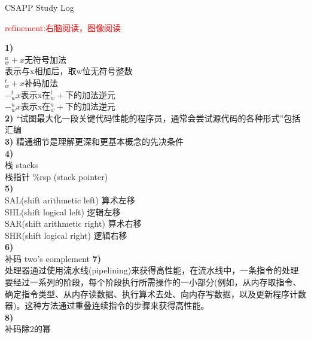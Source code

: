 \documentclass{article}
\newcommand{\red}[1]{\textcolor{red}{#1}}
\begin{document}
\begin{CJK}{UTF8}{gkai}
\end{CJK}
\begin{CJK}{UTF8}{gbsn}
\end{CJK}
\begin{CJK}{UTF8}{uyhei}
\fontsize{40pt}{40pt}\selectfont
\centerline{CSAPP Study Log}			
\fontsize{25pt}{25pt}\selectfont
\centerline{\red{refinement:右脑阅读，图像阅读}}	
\fontsize{18pt}{18pt}\selectfont
\noindent\textbf{1)}			\\
$_w^u+x$无符号加法			\\[0.5ex]
表示与x相加后，取w位无符号整数		\\[0.5ex]
$_w^t+x$补码加法			\\[0.5ex]
$-_w^tx$表示x在$^t_w+$下的加法逆元	\\[0.5ex]
$-_w^ux$表示x在$_w^u+$下的加法逆元	\\[1ex]
\textbf{2)}
``试图最大化一段关键代码性能的程序员，通常会尝试源代码的各种形式''包括汇编	\\[1ex]
\textbf{3)}
精通细节是理解更深和更基本概念的先决条件	\\[1ex]
\textbf{4)}	\\
栈	stacks	\\[1ex]
栈指针	\%rsp	(stack pointer)	\\[1ex]
\textbf{5)}	\\
SAL(shift arithmetic left)	算术左移	\\
SHL(shift logical left)		逻辑左移	\\
SAR(shift arithmetic right)	算术右移	\\
SHR(shift logical right)	逻辑右移	\\[1ex]
\textbf{6)}	\\
补码	two's complement
\textbf{7)}	\\
处理器通过使用流水线(pipelining)来获得高性能，在流水线中，一条指令的处理要经过一系列的阶段，每个阶段执行所需操作的一小部分(例如，从内存取指令、确定指令类型、从内存读数据、执行算术去处、向内存写数据，以及更新程序计数器)。这种方法通过重叠连续指令的步骤来获得高性能。	\\[1ex]
\textbf{8)}	\\
补码除2的幂	\\

\end{CJK}
\end{document}
